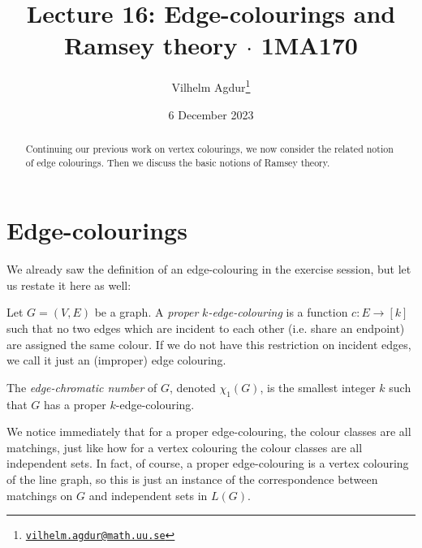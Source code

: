 \documentclass[nobib]{tufte-handout}
\title{Lecture 16: Edge-colourings and Ramsey theory $\cdot$ 1MA170}
\author[Vilhelm Agdur]{Vilhelm Agdur\thanks{\href{mailto:vilhelm.agdur@math.uu.se}{\nolinkurl{vilhelm.agdur@math.uu.se}}}}
\date{6 December 2023}
\begin{document}
\maketitle%

\begin{abstract}
\noindent
Continuing our previous work on vertex colourings, we now consider the related notion of edge colourings. Then we discuss the basic notions of Ramsey theory.
\end{abstract}

\section{Edge-colourings}

We already saw the definition of an edge-colouring in the exercise session, but let us restate it here as well:

\begin{definition}
    Let $G = (V,E)$ be a graph. A \emph{proper} \emph{$k$-edge-colouring} is a function $c: E \to [k]$ such that no two edges which are incident to each other (i.e. share an endpoint) are assigned the same colour. If we do not have this restriction on incident edges, we call it just an (improper) edge colouring.

    The \emph{edge-chromatic number} of $G$, denoted $\chi_1(G)$, is the smallest integer $k$ such that $G$ has a proper $k$-edge-colouring.
\end{definition}

\begin{remark}
    We notice immediately that for a proper edge-colouring, the colour classes are all matchings, just like how for a vertex colouring the colour classes are all independent sets. In fact, of course, a proper edge-colouring is a vertex colouring of the line graph, so this is just an instance of the correspondence between matchings on $G$ and independent sets in $L(G)$.
\end{remark}
\end{document}
